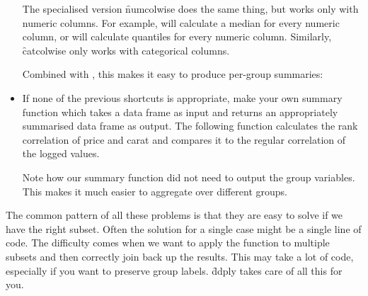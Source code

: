 \begin{itemize}
   The specialised version \f{numcolwise} does the same thing, but works only with numeric columns.  For example,  will calculate a median for every numeric column, or  will calculate quantiles for every numeric column.  Similarly, \f{catcolwise} only works with categorical columns.  
  
    
  
  Combined with , this makes it easy to produce per-group summaries: 
  
    
  
  \item If none of the previous shortcuts is appropriate, make your own summary function which takes a data frame as input and returns an appropriately summarised data frame as output.  The following function calculates the rank correlation of price and carat and compares it to the regular correlation of the logged values.
  
    
  
  Note how our summary function did not need to output the group variables.  This makes it much easier to aggregate over different groups.
\end{itemize}

The common pattern of all these problems is that they are easy to solve if we have the right subset. Often the solution for a single case might be a single line of code. The difficulty comes when we want to apply the function to multiple subsets and then correctly join back up the results. This may take a lot of code, especially if you want to preserve group labels. \f{ddply} takes care of all this for you.

